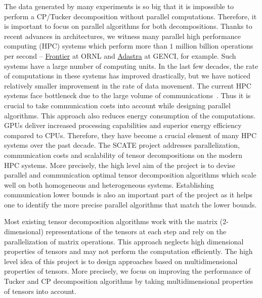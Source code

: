 \documentclass[a4paper,11pt]{article}
\begin{document}
	
	The data generated by many experiments is so big that it is impossible to perform a CP/Tucker decomposition without parallel computations. Therefore, it is important to focus on parallel algorithms for both decompositions. Thanks to recent advances in architectures, we witness many parallel high performance computing (HPC) systems which perform more than $1$ million billion operations per second -- \href{https://www.olcf.ornl.gov/frontier}{Frontier} at ORNL and \href{https://www.genci.fr/en/our-computers}{Adastra} at GENCI, for example. Such systems have a large number of computing units. In the last few decades, the rate of computations in these systems has improved drastically, but we have noticed relatively smaller improvement in the rate of data movement. The current HPC systems face bottleneck due to the large volume of communications~\cite{DOE-Report-2014}. Thus it is crucial to take communication costs into account while designing parallel algorithms. This approach also reduces energy consumption of the computations. GPUs deliver increased processing capabilities and superior energy efficiency compared to CPUs. Therefore, they have become a crucial element of many HPC systems over the past decade. The SCATE project addresses parallelization, communication costs and scalability of tensor decompositions on the modern HPC systems. More precisely, the high level aim of the project is to devise parallel and communication optimal tensor decomposition algorithms which scale well on both homogeneous and heterogeneous systems. Establishing communication lower bounds is also an important part of the project as it helps one to identify the more precise parallel algorithms that match the lower bounds.	
	
	
	Most existing tensor decomposition algorithms work with the matrix (2-dimensional) representations of the tensors at each step and rely on the parallelization of matrix operations. This approach neglects high dimensional properties of tensors and may not perform the computation efficiently. The high level idea of this project is to design approaches based on multidimensional properties of tensors. More precisely, we focus on improving the performance of Tucker and CP decomposition algorithms by taking multidimensional properties of tensors into account.
	
	
	
\end{document}
